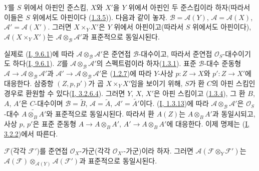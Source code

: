 \begin{env}[1.4.6]
\label{II.1.4.6-ko}
$Y$를 $S$ 위에서 아핀인 준스킴, $X$와 $X'$을 $Y$ 위에서 아핀인
두 준스킴이라 하자(따라서 이들은 $S$ 위에서도 아핀이다
(\hyperref[II.1.3.5-ko]{1.3.5})). 다음과 같이 놓자.
$\mathcal{B}=\mathcal{A}(Y)$, $\mathcal{A}=\mathcal{A}(X)$,
$\mathcal{A}'=\mathcal{A}(X')$. 그러면 $X\times_Y X'$은 $Y$ 위에서
아핀이고(따라서 $S$ 위에서도 아핀이다),
$\mathcal{A}(X\times_Y X')$는
$\mathcal{A}\otimes_{\mathcal{B}}\mathcal{A}'$과 표준적으로
동일시된다.
\end{env}

실제로 (\hyperref[I.9.6.1-ko]{I, 9.6.1})에 따라
$\mathcal{A}\otimes_{\mathcal{B}}\mathcal{A}'$은 준연접
$\mathcal{B}$-대수이고, 따라서 준연접 $\mathcal{O}_S$-대수이기도
하다(\hyperref[I.9.6.1-ko]{I, 9.6.1}).
$Z$를 $\mathcal{A}\otimes_{\mathcal{B}}\mathcal{A}'$의 스펙트럼이라
하자(\hyperref[II.1.3.1-ko]{1.3.1}). 표준
$\mathcal{B}$-대수 준동형
$\mathcal{A}\to\mathcal{A}\otimes_{\mathcal{B}}\mathcal{A}'$과
$\mathcal{A}'\to\mathcal{A}\otimes_{\mathcal{B}}\mathcal{A}'$은
(\hyperref[II.1.2.7-ko]{1.2.7})에 따라 $Y$-사상 $p:Z\to X$와
$p':Z\to X'$에 대응한다. 삼중항 $(Z,p,p')$가 곱
$X\times_Y X'$임을 보이기 위해, $S$가 환 $C$의 아핀 스킴인
경우로 환원할 수 있다(\hyperref[I.3.2.6.4-ko]{I, 3.2.6.4}).
그러면 $Y$, $X$, $X'$은 아핀 스킴이고
(\hyperref[II.1.3.4-ko]{1.3.4}), 그 환 $B$, $A$, $A'$은
$C$-대수이며
$\mathcal{B}=\widetilde{B}$, $\mathcal{A}=\widetilde{A}$,
$\mathcal{A}'=\widetilde{A'}$이다.
(\hyperref[I.1.3.13-ko]{I, 1.3.13})에 따라
$\mathcal{A}\otimes_{\mathcal{B}}\mathcal{A}'$은
$\mathcal{O}_S$-대수 $\widetilde{A\otimes_B A'}$와 표준적으로
동일시된다. 따라서 환 $A(Z)$는 $A\otimes_B A'$과 동일시되고,
사상 $p$, $p'$은 표준 준동형
$A\to A\otimes_B A'$, $A'\to A\otimes_B A'$에 대응한다.
이제 명제는 (\hyperref[I.3.2.2-ko]{I, 3.2.2})에서 따른다.

\begin{env}[1.4.7]
\label{II.1.4.7-ko}
$\mathcal{F}$(각각 $\mathcal{F}'$)를 준연접
$\mathcal{O}_X$-가군(각각 $\mathcal{O}_{X'}$-가군)이라 하자. 그러면
$\mathcal{A}(\mathcal{F}\otimes_Y\mathcal{F}')$는
$\mathcal{A}(\mathcal{F})\otimes_{\mathcal{A}(Y)}
\mathcal{A}(\mathcal{F}')$과 표준적으로 동일시된다.
\end{env}

